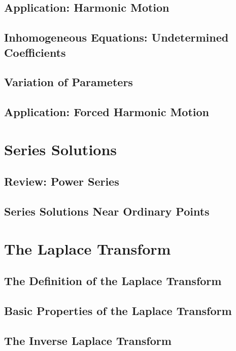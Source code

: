 \documentclass{package/notes}
\begin{document}
\section{Application: Harmonic Motion}

\section{Inhomogeneous Equations: Undetermined Coefficients}

\section{Variation of Parameters}

\section{Application: Forced Harmonic Motion}



\chapter{Series Solutions}

\section{Review: Power Series}

\section{Series Solutions Near Ordinary Points}




\chapter{The Laplace Transform}

\section{The Definition of the Laplace Transform}

\section{Basic Properties of the Laplace Transform}

\section{The Inverse Laplace Transform}
\end{document}
